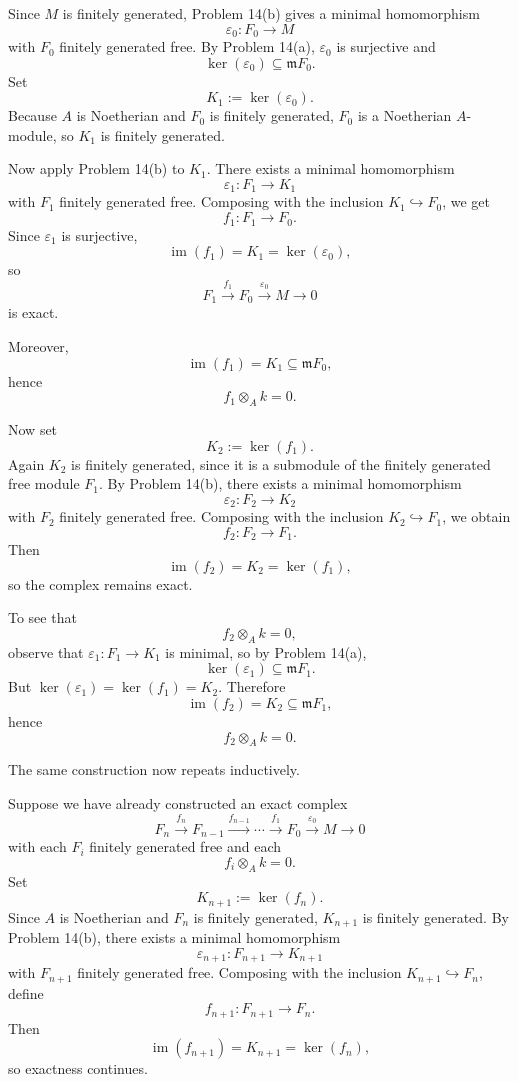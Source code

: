 \documentclass[12pt,a4paper,oneside]{report}
\theoremstyle{notespace}
\begin{document}
\medskip

Since \(M\) is finitely generated, Problem 14(b) gives a minimal homomorphism
\[
\varepsilon_0:F_0\to M
\]
with \(F_0\) finitely generated free. By Problem 14(a), \(\varepsilon_0\) is surjective and
\[
\ker(\varepsilon_0)\subseteq \mathfrak m F_0.
\]
Set
\[
K_1:=\ker(\varepsilon_0).
\]
Because \(A\) is Noetherian and \(F_0\) is finitely generated, \(F_0\) is a Noetherian \(A\)-module, so \(K_1\) is finitely generated.

Now apply Problem 14(b) to \(K_1\). There exists a minimal homomorphism
\[
\varepsilon_1:F_1\to K_1
\]
with \(F_1\) finitely generated free. Composing with the inclusion \(K_1\hookrightarrow F_0\), we get
\[
f_1:F_1\to F_0.
\]
Since \(\varepsilon_1\) is surjective,
\[
\operatorname{im}(f_1)=K_1=\ker(\varepsilon_0),
\]
so
\[
F_1\xrightarrow{f_1}F_0\xrightarrow{\varepsilon_0}M\to 0
\]
is exact.

Moreover,
\[
\operatorname{im}(f_1)=K_1\subseteq \mathfrak m F_0,
\]
hence
\[
f_1\otimes_A k=0.
\]

Now set
\[
K_2:=\ker(f_1).
\]
Again \(K_2\) is finitely generated, since it is a submodule of the finitely generated free module \(F_1\). By Problem 14(b), there exists a minimal homomorphism
\[
\varepsilon_2:F_2\to K_2
\]
with \(F_2\) finitely generated free. Composing with the inclusion \(K_2\hookrightarrow F_1\), we obtain
\[
f_2:F_2\to F_1.
\]
Then
\[
\operatorname{im}(f_2)=K_2=\ker(f_1),
\]
so the complex remains exact.

To see that
\[
f_2\otimes_A k=0,
\]
observe that \(\varepsilon_1:F_1\to K_1\) is minimal, so by Problem 14(a),
\[
\ker(\varepsilon_1)\subseteq \mathfrak m F_1.
\]
But \(\ker(\varepsilon_1)=\ker(f_1)=K_2\). Therefore
\[
\operatorname{im}(f_2)=K_2\subseteq \mathfrak m F_1,
\]
hence
\[
f_2\otimes_A k=0.
\]

The same construction now repeats inductively.

Suppose we have already constructed an exact complex
\[
F_n\xrightarrow{f_n}F_{n-1}\xrightarrow{f_{n-1}}\cdots\xrightarrow{f_1}F_0\xrightarrow{\varepsilon_0}M\to 0
\]
with each \(F_i\) finitely generated free and each
\[
f_i\otimes_A k=0.
\]
Set
\[
K_{n+1}:=\ker(f_n).
\]
Since \(A\) is Noetherian and \(F_n\) is finitely generated, \(K_{n+1}\) is finitely generated. By Problem 14(b), there exists a minimal homomorphism
\[
\varepsilon_{n+1}:F_{n+1}\to K_{n+1}
\]
with \(F_{n+1}\) finitely generated free. Composing with the inclusion \(K_{n+1}\hookrightarrow F_n\), define
\[
f_{n+1}:F_{n+1}\to F_n.
\]
Then
\[
\operatorname{im}(f_{n+1})=K_{n+1}=\ker(f_n),
\]
so exactness continues.
\end{document}
